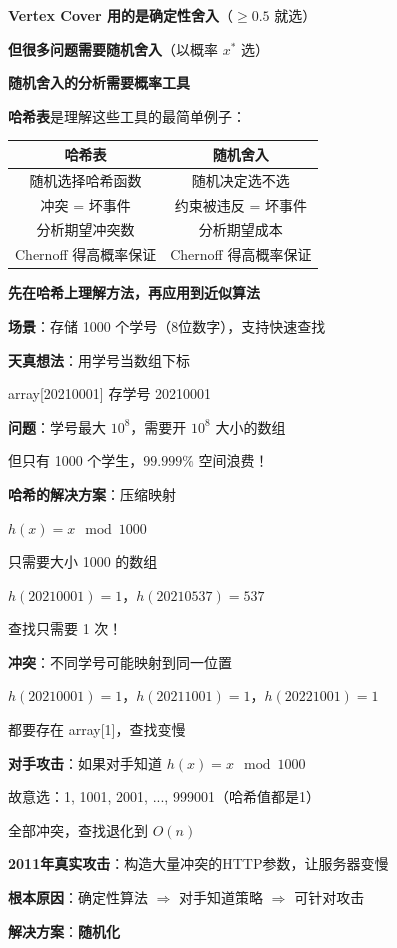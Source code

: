 \documentclass[12pt, a4paper]{ctexart}
\begin{document}
\begin{blackboard}[为什么在这里讲哈希？]

\textbf{Vertex Cover 用的是确定性舍入}（$\geq 0.5$ 就选）

\textbf{但很多问题需要随机舍入}（以概率 $x^*$ 选）

\textbf{随机舍入的分析需要概率工具}

\textbf{哈希表}是理解这些工具的最简单例子：

\begin{center}
\begin{tabular}{c|c}
\textbf{哈希表} & \textbf{随机舍入} \\
\hline
随机选择哈希函数 & 随机决定选不选 \\
冲突 = 坏事件 & 约束被违反 = 坏事件 \\
分析期望冲突数 & 分析期望成本 \\
Chernoff 得高概率保证 & Chernoff 得高概率保证
\end{tabular}
\end{center}

\textbf{先在哈希上理解方法，再应用到近似算法}

\end{blackboard}

\begin{blackboard}

\textbf{场景}：存储 1000 个学号（8位数字），支持快速查找

\textbf{天真想法}：用学号当数组下标

array[20210001] 存学号 20210001

\textbf{问题}：学号最大 $10^8$，需要开 $10^8$ 大小的数组

但只有 1000 个学生，$99.999\%$ 空间浪费！

\textbf{哈希的解决方案}：压缩映射

$h(x) = x \mod 1000$

只需要大小 1000 的数组

$h(20210001) = 1$，$h(20210537) = 537$

查找只需要 1 次！

\end{blackboard}

\begin{blackboard}[哈希冲突与对手攻击]

\textbf{冲突}：不同学号可能映射到同一位置

$h(20210001) = 1$，$h(20211001) = 1$，$h(20221001) = 1$

都要存在 array[1]，查找变慢

\textbf{对手攻击}：如果对手知道 $h(x) = x \mod 1000$

故意选：1, 1001, 2001, ..., 999001（哈希值都是1）

全部冲突，查找退化到 $O(n)$

\textbf{2011年真实攻击}：构造大量冲突的HTTP参数，让服务器变慢

\textbf{根本原因}：确定性算法 $\Rightarrow$ 对手知道策略 $\Rightarrow$ 可针对攻击

\textbf{解决方案}：\textbf{随机化}

\end{blackboard}
\end{document}
